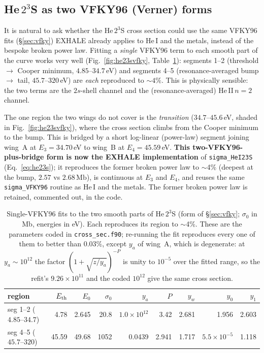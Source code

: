 \documentclass[english,a4paper]{my_memo}
\newcommand{\Mb}{\mathrm{Mb}}
\newcommand{\sig}{\sigma}
\begin{document}
\subsection{He\,$2^3$S as two VFKY96 (Verner) forms}\label{sec:he23svfky}

It is natural to ask whether the He\,$2^3$S cross section could use the same
VFKY96 fits (\S\ref{sec:vfky}) EXHALE already applies to He\,I and the
metals, instead of the bespoke broken power law. Fitting a \emph{single}
VFKY96 term to each smooth part of the curve works very well
(Fig.~\ref{fig:he23svfky}, Table~\ref{tab:he23svfky}): segments 1--2
(threshold $\to$ Cooper minimum, $4.85$--$34.7\,$eV) and segments 4--5
(resonance-averaged bump $\to$ tail, $45.7$--$320\,$eV) are \emph{each}
reproduced to $\sim$$4\%$. This is physically sensible: the two terms are
the $2s$-shell channel and the (resonance-averaged) He\,II\,$n=2$ channel.

The one region the two wings do not cover is the \emph{transition}
($34.7$--$45.6\,$eV, shaded in Fig.~\ref{fig:he23svfky}), where the cross
section climbs from the Cooper minimum to the bump. This is bridged by a
short log-linear (power-law) segment joining wing~A at $E_3=34.70\,$eV to
wing~B at $E_4=45.59\,$eV. \textbf{This two-VFKY96-plus-bridge form is now
the EXHALE implementation} of \texttt{sigma\_HeI23S} (Eq.~\ref{eq:he23s});
it reproduces the former broken power law to $\sim$4\% (deepest at the
bump, $2.57$ vs $2.68\,\Mb$), is continuous at $E_3$ and $E_4$, and reuses
the same \texttt{sigma\_VFKY96} routine as He\,I and the metals. The former
broken power law is retained, commented out, in the code.

\begin{table}[h]
\centering
\caption{Single-VFKY96 fits to the two smooth parts of He\,$2^3$S (form of
\S\ref{sec:vfky}; $\sig_0$ in Mb, energies in eV). Each reproduces its
region to $\sim$4\%. These are the parameters coded in
\texttt{cross\_sec.f90}; re-running the fit reproduces every one of them to
better than $0.03\%$, except $y_a$ of wing~A, which is degenerate: at
$y_a\sim10^{12}$ the factor $(1+\sqrt{z/y_a})^{-P}$ is unity to $10^{-5}$ over
the fitted range, so the refit's $9.26\times10^{11}$ and the coded $10^{12}$
give the same cross section.}
\label{tab:he23svfky}
\begin{tabular}{lrrrrrrrr}
\toprule
region & $E_{\rm th}$ & $E_0$ & $\sig_0$ & $y_a$ & $P$ & $y_w$ & $y_0$ & $y_1$\\
\midrule
seg 1--2 ($4.85$--$34.7$)  & 4.78  & 2.645 & 20.8  & $1.0{\times}10^{12}$ & 3.42 & 2.681 & 1.956 & 2.603\\
seg 4--5 ($45.7$--$320$)   & 45.59 & 49.68 & 1052  & 0.0439 & 2.941 & 1.717 & $5.5{\times}10^{-5}$ & 1.118\\
\bottomrule
\end{tabular}
\end{table}
\end{document}
